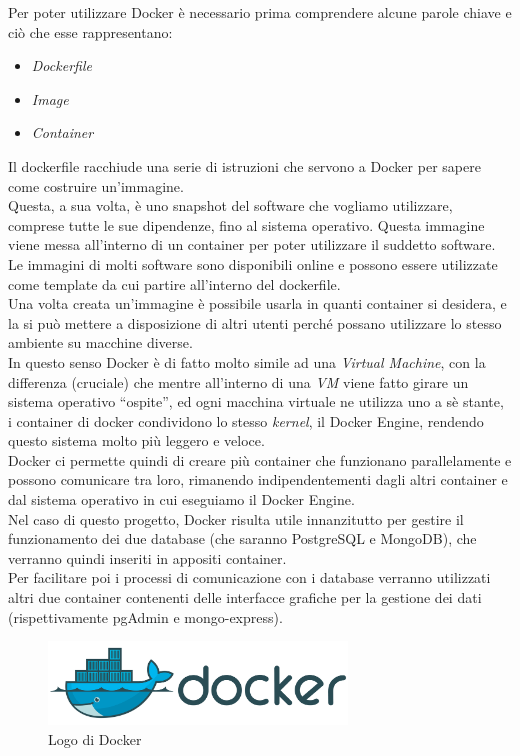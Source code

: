 \noindent Per poter utilizzare Docker è necessario prima comprendere alcune parole chiave e ciò che esse rappresentano:
\begin{itemize}
    \item \textit{Dockerfile}
    \item \textit{Image}
    \item \textit{Container}
\end{itemize}
Il dockerfile racchiude una serie di istruzioni che servono a Docker per sapere come costruire un'immagine.\\
Questa, a sua volta, è uno snapshot del software che vogliamo utilizzare, comprese tutte le sue dipendenze, fino al sistema operativo. Questa immagine viene messa all'interno di un container per poter utilizzare il suddetto software.\\
Le immagini di molti software sono disponibili online e possono essere utilizzate come template da cui partire all'interno del dockerfile.\\
Una volta creata un'immagine è possibile usarla in quanti container si desidera, e la si può mettere a disposizione di altri utenti perché possano utilizzare lo stesso ambiente su macchine diverse.\\
In questo senso Docker è di fatto molto simile ad una \textit{Virtual Machine}, con la differenza (cruciale) che mentre all'interno di una \textit{VM} viene fatto girare un sistema operativo ``ospite'', ed ogni macchina virtuale ne utilizza uno a sè stante, i container di docker condividono lo stesso \textit{kernel}, il Docker Engine, rendendo questo sistema molto più leggero e veloce.\\
Docker ci permette quindi di creare più container che funzionano parallelamente e possono comunicare tra loro, rimanendo indipendentementi dagli altri container e dal sistema operativo in cui eseguiamo il Docker Engine.\\

\noindent Nel caso di questo progetto, Docker risulta utile innanzitutto per gestire il funzionamento dei due database (che saranno PostgreSQL e MongoDB), che verranno quindi inseriti in appositi container.\\
Per facilitare poi i processi di comunicazione con i database verranno utilizzati altri due container contenenti delle interfacce grafiche per la gestione dei dati (rispettivamente pgAdmin e mongo-express).

\begin{figure}[htbp]
\begin{center}
\includegraphics[height=6em]{immagini/tecnologies-logos/Docker-Logo.png}
\caption{Logo di Docker}
\end{center}
\end{figure}

